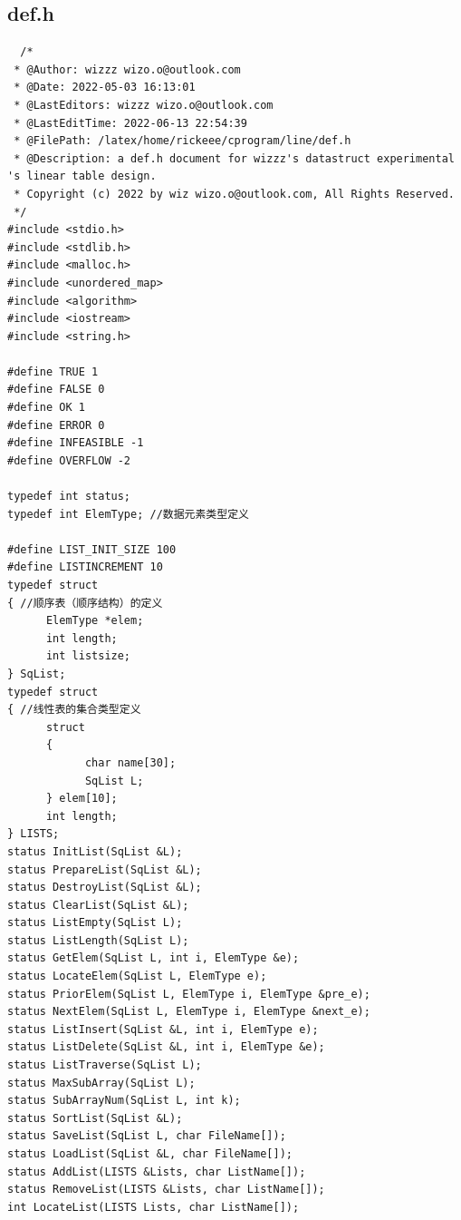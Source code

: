 \documentclass[supercite]{Experimental_Report}
\theoremstyle{definition}
\begin{document}
\subsection{def.h}
\begin{lstlisting}
  /*
 * @Author: wizzz wizo.o@outlook.com
 * @Date: 2022-05-03 16:13:01
 * @LastEditors: wizzz wizo.o@outlook.com
 * @LastEditTime: 2022-06-13 22:54:39
 * @FilePath: /latex/home/rickeee/cprogram/line/def.h
 * @Description: a def.h document for wizzz's datastruct experimental 's linear table design.
 * Copyright (c) 2022 by wiz wizo.o@outlook.com, All Rights Reserved. 
 */
#include <stdio.h>
#include <stdlib.h>
#include <malloc.h>
#include <unordered_map>
#include <algorithm>
#include <iostream>
#include <string.h>

#define TRUE 1
#define FALSE 0
#define OK 1
#define ERROR 0
#define INFEASIBLE -1
#define OVERFLOW -2

typedef int status;
typedef int ElemType; //数据元素类型定义

#define LIST_INIT_SIZE 100
#define LISTINCREMENT 10
typedef struct
{ //顺序表（顺序结构）的定义
      ElemType *elem;
      int length;
      int listsize;
} SqList;
typedef struct
{ //线性表的集合类型定义
      struct
      {
            char name[30];
            SqList L;
      } elem[10];
      int length;
} LISTS;
status InitList(SqList &L);
status PrepareList(SqList &L);
status DestroyList(SqList &L);
status ClearList(SqList &L);
status ListEmpty(SqList L);
status ListLength(SqList L);
status GetElem(SqList L, int i, ElemType &e);
status LocateElem(SqList L, ElemType e); 
status PriorElem(SqList L, ElemType i, ElemType &pre_e);
status NextElem(SqList L, ElemType i, ElemType &next_e);
status ListInsert(SqList &L, int i, ElemType e);
status ListDelete(SqList &L, int i, ElemType &e);
status ListTraverse(SqList L);
status MaxSubArray(SqList L);             
status SubArrayNum(SqList L, int k);        
status SortList(SqList &L);                
status SaveList(SqList L, char FileName[]); 
status LoadList(SqList &L, char FileName[]);
status AddList(LISTS &Lists, char ListName[]);   
status RemoveList(LISTS &Lists, char ListName[]); 
int LocateList(LISTS Lists, char ListName[]);     
\end{lstlisting}
\end{document}
